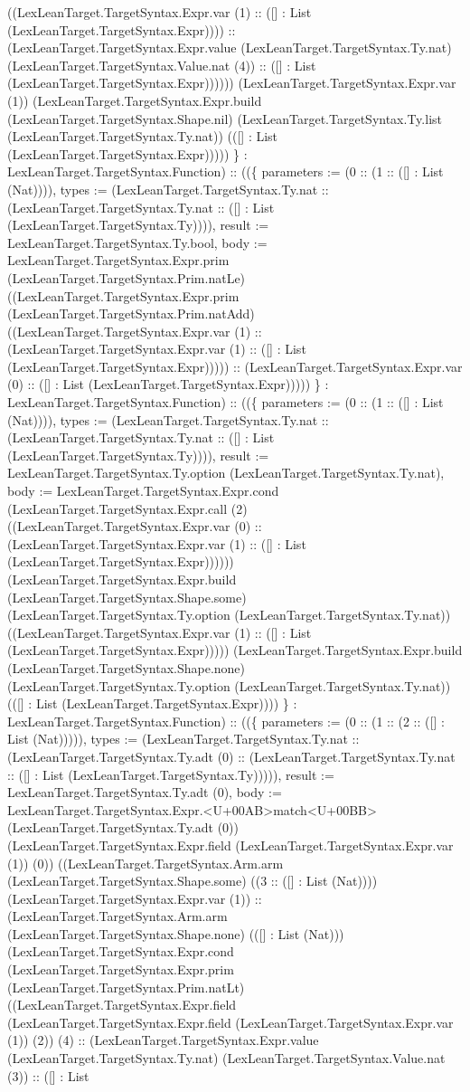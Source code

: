 \documentclass[11pt]{article}
\begin{document}
((LexLeanTarget.TargetSyntax.Expr.var (1) :: ([] : List (LexLeanTarget.TargetSyntax.Expr)))) :: (LexLeanTarget.TargetSyntax.Expr.value (LexLeanTarget.TargetSyntax.Ty.nat) (LexLeanTarget.TargetSyntax.Value.nat (4)) :: ([] : List (LexLeanTarget.TargetSyntax.Expr)))))) (LexLeanTarget.TargetSyntax.Expr.var (1)) (LexLeanTarget.TargetSyntax.Expr.build (LexLeanTarget.TargetSyntax.Shape.nil) (LexLeanTarget.TargetSyntax.Ty.list (LexLeanTarget.TargetSyntax.Ty.nat)) (([] : List (LexLeanTarget.TargetSyntax.Expr))))) \} : LexLeanTarget.TargetSyntax.Function) :: ((\{ parameters := (0 :: (1 :: ([] : List (Nat)))), types := (LexLeanTarget.TargetSyntax.Ty.nat :: (LexLeanTarget.TargetSyntax.Ty.nat :: ([] : List (LexLeanTarget.TargetSyntax.Ty)))), result := LexLeanTarget.TargetSyntax.Ty.bool, body := LexLeanTarget.TargetSyntax.Expr.prim (LexLeanTarget.TargetSyntax.Prim.natLe) ((LexLeanTarget.TargetSyntax.Expr.prim (LexLeanTarget.TargetSyntax.Prim.natAdd) ((LexLeanTarget.TargetSyntax.Expr.var (1) :: (LexLeanTarget.TargetSyntax.Expr.var (1) :: ([] : List (LexLeanTarget.TargetSyntax.Expr))))) :: (LexLeanTarget.TargetSyntax.Expr.var (0) :: ([] : List (LexLeanTarget.TargetSyntax.Expr))))) \} : LexLeanTarget.TargetSyntax.Function) :: ((\{ parameters := (0 :: (1 :: ([] : List (Nat)))), types := (LexLeanTarget.TargetSyntax.Ty.nat :: (LexLeanTarget.TargetSyntax.Ty.nat :: ([] : List (LexLeanTarget.TargetSyntax.Ty)))), result := LexLeanTarget.TargetSyntax.Ty.option (LexLeanTarget.TargetSyntax.Ty.nat), body := LexLeanTarget.TargetSyntax.Expr.cond (LexLeanTarget.TargetSyntax.Expr.call (2) ((LexLeanTarget.TargetSyntax.Expr.var (0) :: (LexLeanTarget.TargetSyntax.Expr.var (1) :: ([] : List (LexLeanTarget.TargetSyntax.Expr)))))) (LexLeanTarget.TargetSyntax.Expr.build (LexLeanTarget.TargetSyntax.Shape.some) (LexLeanTarget.TargetSyntax.Ty.option (LexLeanTarget.TargetSyntax.Ty.nat)) ((LexLeanTarget.TargetSyntax.Expr.var (1) :: ([] : List (LexLeanTarget.TargetSyntax.Expr))))) (LexLeanTarget.TargetSyntax.Expr.build (LexLeanTarget.TargetSyntax.Shape.none) (LexLeanTarget.TargetSyntax.Ty.option (LexLeanTarget.TargetSyntax.Ty.nat)) (([] : List (LexLeanTarget.TargetSyntax.Expr)))) \} : LexLeanTarget.TargetSyntax.Function) :: ((\{ parameters := (0 :: (1 :: (2 :: ([] : List (Nat))))), types := (LexLeanTarget.TargetSyntax.Ty.nat :: (LexLeanTarget.TargetSyntax.Ty.adt (0) :: (LexLeanTarget.TargetSyntax.Ty.nat :: ([] : List (LexLeanTarget.TargetSyntax.Ty))))), result := LexLeanTarget.TargetSyntax.Ty.adt (0), body := LexLeanTarget.TargetSyntax.Expr.<U+00AB>match<U+00BB> (LexLeanTarget.TargetSyntax.Ty.adt (0)) (LexLeanTarget.TargetSyntax.Expr.field (LexLeanTarget.TargetSyntax.Expr.var (1)) (0)) ((LexLeanTarget.TargetSyntax.Arm.arm (LexLeanTarget.TargetSyntax.Shape.some) ((3 :: ([] : List (Nat)))) (LexLeanTarget.TargetSyntax.Expr.var (1)) :: (LexLeanTarget.TargetSyntax.Arm.arm (LexLeanTarget.TargetSyntax.Shape.none) (([] : List (Nat))) (LexLeanTarget.TargetSyntax.Expr.cond (LexLeanTarget.TargetSyntax.Expr.prim (LexLeanTarget.TargetSyntax.Prim.natLt) ((LexLeanTarget.TargetSyntax.Expr.field (LexLeanTarget.TargetSyntax.Expr.field (LexLeanTarget.TargetSyntax.Expr.var (1)) (2)) (4) :: (LexLeanTarget.TargetSyntax.Expr.value (LexLeanTarget.TargetSyntax.Ty.nat) (LexLeanTarget.TargetSyntax.Value.nat (3)) :: ([] : List 
\end{document}
